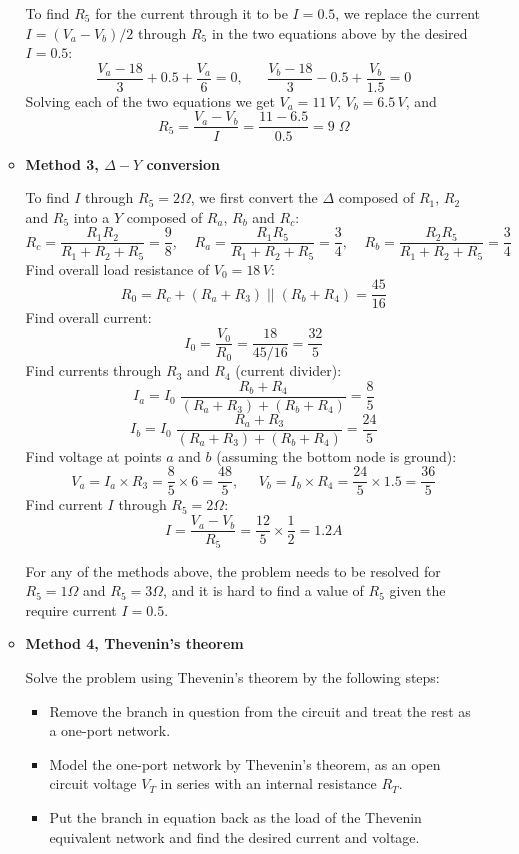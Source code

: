 \begin{itemize}
\begin{itemize}
To find $R_5$ for the current through it to be $I=0.5$, we 
replace the current $I=(V_a-V_b)/2$ through $R_5$ in the two 
equations above by the desired $I=0.5$:
\[
\frac{V_a-18}{3}+0.5+\frac{V_a}{6}=0,\;\;\;\;\;\;
\frac{V_b-18}{3}-0.5+\frac{V_b}{1.5}=0
\]
Solving each of the two equations we get $V_a=11\,V$, $V_b=6.5\,V$,
and 
\[
R_5=\frac{V_a-V_b}{I}=\frac{11-6.5}{0.5}=9\;\Omega
\]

\item {\bf Method 3, $\Delta-Y$ conversion}


To find $I$ through $R_5=2\Omega$, we first convert the $\Delta$ 
composed of $R_1$, $R_2$ and $R_5$ into a $Y$ composed of $R_a$, 
$R_b$ and $R_c$:
\[ 
R_c=\frac{R_1R_2}{R_1+R_2+R_5}=\frac{9}{8},\;\;\;\;
R_a=\frac{R_1R_5}{R_1+R_2+R_5}=\frac{3}{4},\;\;\;\;
R_b=\frac{R_2R_5}{R_1+R_2+R_5}=\frac{3}{4}
\]
Find overall load resistance of $V_0=18\,V$:
\[
R_0=R_c+(R_a+R_3) \;||\; (R_b+R_4)=\frac{45}{16}	
\]
Find overall current:
\[
I_0=\frac{V_0}{R_0}=\frac{18}{45/16}=\frac{32}{5}
\]
Find currents through $R_3$ and $R_4$ (current divider):
\[ 
I_a=I_0\;\frac{R_b+R_4}{(R_a+R_3)+(R_b+R_4)}=\frac{8}{5} 
\]
\[ 
I_b=I_0\;\frac{R_a+R_3}{(R_a+R_3)+(R_b+R_4)}=\frac{24}{5}
\]
Find voltage at points $a$ and $b$ (assuming the bottom node
is ground):
\[
V_a=I_a \times R_3=\frac{8 }{5} \times 6=\frac{48}{5},\;\;\;\;\;
V_b=I_b \times R_4=\frac{24}{5} \times 1.5=\frac{36}{5}	
\]
Find current $I$ through $R_5=2\Omega$:
\[
I=\frac{V_a-V_b}{R_5}=\frac{12}{5}\times \frac{1}{2}=1.2A
\]

For any of the methods above, the problem needs to be resolved
for $R_5=1\Omega$ and $R_5=3\Omega$, and it is hard to find a 
value of $R_5$ given the require current $I=0.5$.


\item {\bf Method 4, Thevenin's theorem}

Solve the problem using Thevenin's theorem by the following steps:
\begin{itemize}
\item Remove the branch in question from the circuit and treat the rest as
  a one-port network.
\item Model the one-port network by Thevenin's theorem, as an open circuit 
  voltage $V_T$ in series with an internal resistance $R_T$.
\item Put the branch in equation back as the load of the Thevenin equivalent
  network and find the desired current and voltage.
\end{itemize}


\end{itemize}
\end{itemize}
